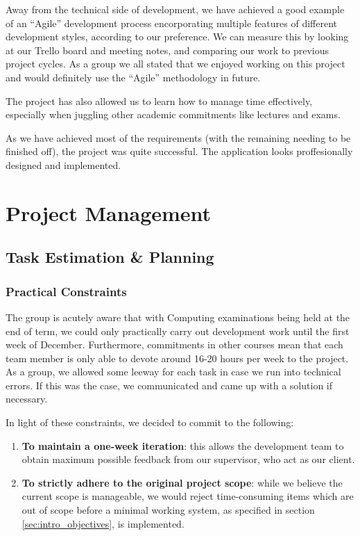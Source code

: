 \documentclass[a4paper, titlepage]{article}
\begin{document}
Away from the technical side of development, we have achieved a good example of an ``Agile'' development
process encorporating multiple features of different development styles, according to our preference. 
We can measure this by looking at our Trello board and meeting notes, and comparing our work to 
previous project cycles. As a group we all stated that we enjoyed working on this project and would 
definitely use the ``Agile'' methodology in future. 

The project has also allowed us to learn how to manage time effectively, especially when juggling 
other academic commitments like lectures and exams. 

As we have achieved most of the requirements (with the remaining needing to be finished off), the 
project was quite successful. The application looks proffesionally designed and implemented.

\newpage
\section{Project Management}

\subsection{Task Estimation \& Planning}

\subsubsection{Practical Constraints}
The group is acutely aware that with Computing examinations being held at the
end of term, we could only practically carry out development work until the
first week of December. Furthermore, commitments in other courses mean that 
each team member is only able to devote around 16-20 hours per week to
the project. As a group, we allowed some leeway for each task in case we run into technical errors. If this was the case, we communicated and came up with a solution if necessary.

In light of these constraints, we decided to commit to the following:
\begin{enumerate}
  \item \textbf{To maintain a one-week iteration}: this allows the development team to
        obtain maximum possible feedback from our supervisor, who act as our client.
  \item \textbf{To strictly adhere to the original project scope}: while we believe the
        current scope is manageable, we would reject time-consuming items which
        are out of scope before a minimal working system, as specified in section \ref{sec:intro_objectives}, is implemented.
\end{enumerate}
\end{document}
